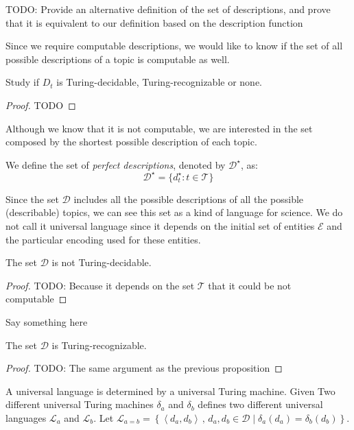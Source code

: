 {\color{red} TODO: Provide an alternative definition of the set of descriptions, and prove that it is equivalent to our definition based on the description function}

Since we require computable descriptions, we would like to know if the set of all possible descriptions of a topic is computable as well.

\begin{proposition}
Study if $D_{t}$ is Turing-decidable, Turing-recognizable or none.
\end{proposition}
\begin{proof}
{\color{red} TODO}
\end{proof}

Although we know that it is not computable, we are interested in the set composed by the shortest possible description of each topic.

\begin{definition}
We define the set of \emph{perfect descriptions}, denoted by $\mathcal{D}^\star$, as:
\[
\mathcal{D}^\star = \{ d_t^\star : t \in \mathcal{T} \}
\]
\end{definition}

Since the set $\mathcal{D}$ includes all the possible descriptions of all the possible (describable) topics, we can see this set as a kind of language for science. We do not call it universal language since it depends on the initial set of entities $\mathcal{E}$ and the particular encoding used for these entities.

\begin{proposition}
The set $\mathcal{D}$ is not Turing-decidable.
\end{proposition}
\begin{proof}
{\color{red} TODO: Because it depends on the set $\mathcal{T}$ that it could be not computable}
\end{proof}

Say something here

\begin{proposition}
The set $\mathcal{D}$ is Turing-recognizable.
\end{proposition}
\begin{proof}
{\color{red} TODO: The same argument as the previous proposition}
\end{proof}

A universal language is determined by a universal Turing machine. Given Two different universal Turing machines $\delta_{a}$ and $\delta_{b}$ defines two different universal languages $\mathcal{L}_{a}$ and $\mathcal{L}_{b}$. Let $\mathcal{L}_{a=b}=\left\{ \left\langle d_{a},d_{b}\right\rangle \,,\,d_{a},d_{b}\in\mathcal{D}\mid\delta_{a}\left(d_{a}\right)=\delta_{b}\left(d_{b}\right)\right\}$.

